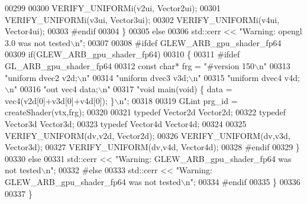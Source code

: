 \begin{DoxyCode}
00299       
00300       VERIFY\_UNIFORMi(v2ui, Vector2ui);
00301       VERIFY\_UNIFORMi(v3ui, Vector3ui);
00302       VERIFY\_UNIFORMi(v4ui, Vector4ui);
00303 \textcolor{preprocessor}{      #endif}
00304     \}
00305     \textcolor{keywordflow}{else}
00306       std::cerr << \textcolor{stringliteral}{"Warning: opengl 3.0 was not tested\(\backslash\)n"};
00307     
00308 \textcolor{preprocessor}{    #ifdef GLEW\_ARB\_gpu\_shader\_fp64}
00309     \textcolor{keywordflow}{if}(GLEW\_ARB\_gpu\_shader\_fp64)
00310     \{
00311 \textcolor{preprocessor}{      #ifdef GL\_ARB\_gpu\_shader\_fp64}
00312       \textcolor{keyword}{const} \textcolor{keywordtype}{char}* frg = \textcolor{stringliteral}{"#version 150\(\backslash\)n"}
00313         \textcolor{stringliteral}{"uniform dvec2 v2d;\(\backslash\)n"}
00314         \textcolor{stringliteral}{"uniform dvec3 v3d;\(\backslash\)n"}
00315         \textcolor{stringliteral}{"uniform dvec4 v4d;\(\backslash\)n"}
00316         \textcolor{stringliteral}{"out vec4 data;\(\backslash\)n"}
00317         \textcolor{stringliteral}{"void main(void) \{ data = vec4(v2d[0]+v3d[0]+v4d[0]); \}\(\backslash\)n"};
00318         
00319       GLint prg\_id = createShader(vtx,frg);
00320       
00321       \textcolor{keyword}{typedef} Vector2d Vector2d;
00322       \textcolor{keyword}{typedef} Vector3d Vector3d;
00323       \textcolor{keyword}{typedef} Vector4d Vector4d;
00324       
00325       VERIFY\_UNIFORM(dv,v2d, Vector2d);
00326       VERIFY\_UNIFORM(dv,v3d, Vector3d);
00327       VERIFY\_UNIFORM(dv,v4d, Vector4d);
00328 \textcolor{preprocessor}{      #endif}
00329     \}
00330     \textcolor{keywordflow}{else}
00331       std::cerr << \textcolor{stringliteral}{"Warning: GLEW\_ARB\_gpu\_shader\_fp64 was not tested\(\backslash\)n"};
00332 \textcolor{preprocessor}{    #else}
00333       std::cerr << \textcolor{stringliteral}{"Warning: GLEW\_ARB\_gpu\_shader\_fp64 was not tested\(\backslash\)n"};
00334 \textcolor{preprocessor}{    #endif}
00335   \}
00336   
00337 \}
\end{DoxyCode}
